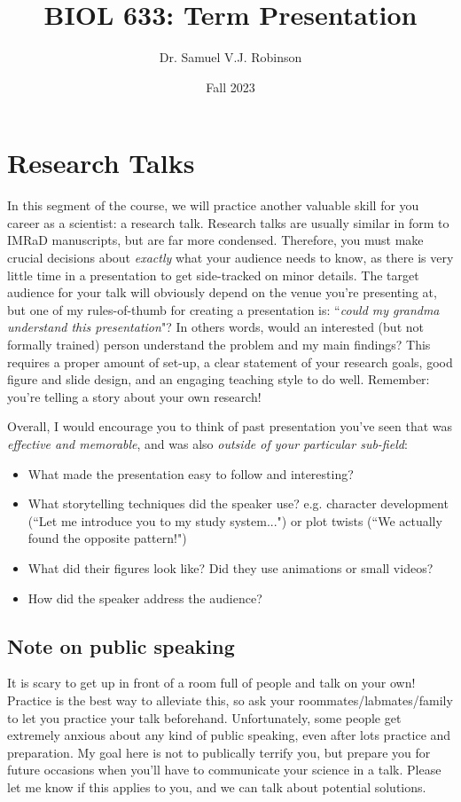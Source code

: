 \documentclass[11pt]{article}
\title{BIOL 633: Term Presentation}
\author{Dr. Samuel V.J. Robinson}
\date{Fall 2023}
\begin{document}
\maketitle

\section*{Research Talks}

In this segment of the course, we will practice another valuable skill for you career as a scientist: a research talk. Research talks are usually similar in form to IMRaD manuscripts, but are far more condensed. Therefore, you must make crucial decisions about \emph{exactly} what your audience needs to know, as there is very little time in a presentation to get side-tracked on minor details. The target audience for your talk will obviously depend on the venue you're presenting at, but one of my rules-of-thumb for creating a presentation is: ``\emph{could my grandma understand this presentation}"? In others words, would an interested (but not formally trained) person understand the problem and my main findings? This requires a proper amount of set-up, a clear statement of your research goals, good figure and slide design, and an engaging teaching style to do well. Remember: you're telling a story about your own research! 

Overall, I would encourage you to think of past presentation you've seen that was \emph{effective and memorable}, and was also \emph{outside of your particular sub-field}:
\begin{itemize}
\item What made the presentation easy to follow and interesting?
\item What storytelling techniques did the speaker use? e.g. character development (``Let me introduce you to my study system...") or plot twists (``We actually found the opposite pattern!")
\item What did their figures look like? Did they use animations or small videos?
\item How did the speaker address the audience? 
\end{itemize}

\subsection*{Note on public speaking}

It is scary to get up in front of a room full of people and talk on your own! Practice is the best way to alleviate this, so ask your roommates/labmates/family to let you practice your talk beforehand. Unfortunately, some people get extremely anxious about any kind of public speaking, even after lots practice and preparation. My goal here is not to publically terrify you, but prepare you for future occasions when you'll have to communicate your science in a talk. Please let me know if this applies to you, and we can talk about potential solutions.
\end{document}

